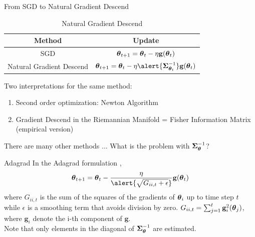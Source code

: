 \documentclass[xcolor=pdftex,dvipsnames,table,mathserif]{beamer}
\begin{document}
\begin{frame}{From SGD to Natural Gradient Descend}
\begin{table}[htp]
\caption{Natural Gradient Descend  \cite{amari2000adaptive} }
\begin{center}
\begin{tabular}{|c|c|} \hline
Method & Update\\ \hline
SGD  & $\boldsymbol{\theta}_{t+1}= \boldsymbol{\theta}_{t}-\eta\mathbf{g}(\boldsymbol{\theta}_{t})$ \\ \hline
Natural Gradient Descend& $\param_{t+1}= \param_{t}-\eta \alert{\mathbf{\Sigma}_{\param_{t}}^{-1}} \mathbf{g}(\param_{t})$ \\ \hline
\end{tabular}
\end{center}
\label{default}
\end{table}%
Two interpretations for the same method:
\begin{enumerate}
\item Second order optimization:  Newton Algorithm \cite{lecun2012efficient}
\item Gradient Descend in the Riemannian Manifold \cite{amari1998natural} = Fisher Information Matrix (empirical version)
\end{enumerate}
There are many other methods ... \alert{What is the problem with $\mathbf{\Sigma}_{\boldsymbol{\theta}}^{-1}$}?
\end{frame}

\begin{frame}{Adagrad}
In the Adagrad formulation \cite{duchi2011adaptive},
\begin{equation}
\param_{t+1}= \param_{t}- \frac{\eta}{\alert{\sqrt { G_{ii,t}+\epsilon  }}} \mathbf{g}(\param_{t})
\end{equation}
where $G_{ii,t}$ is the sum of the squares of the gradients of $\boldsymbol{\theta}_i$ up to time step $t$ while $\epsilon$ is a smoothing term that avoids division by zero.
$G_{ii,t}=\sum_{j=1}^{t}  \mathbf{g}^2_{i}(\boldsymbol{\theta}_{j})$, where $\mathbf{g}_{i}$ denote the i-th component of $\mathbf{g}$.\\
\alert{Note that only elements in the diagonal of $\mathbf{\Sigma}_{\boldsymbol{\theta}}^{-1}$ are estimated.}
\end{frame}
\end{document}
